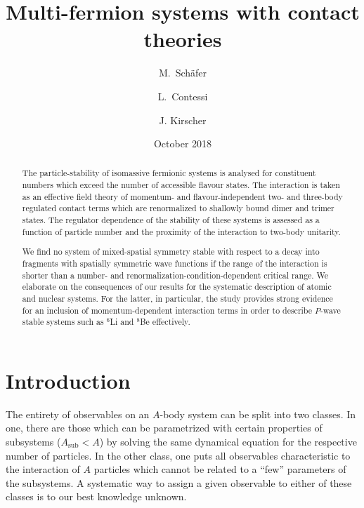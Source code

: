 \documentclass[preprint,12pt]{elsarticle}
\begin{document}
\title{Multi-fermion systems with contact theories}
\author{M.~Sch{\"a}fer}\address{Czech Technical University in Prague, Faculty of Nuclear Sciences 
and Physical Engineering, B\v{r}ehov\'{a} 7, 11519 Prague 1, Czech Republic} 
\author{L.~Contessi} 
\address{Racah Institute of Physics, The Hebrew university, 91904 Jerusalem, 
Israel} 
\address{ESNT, IRFU, CEA, Universite Paris Saclay, F-91191 Gif-sur-Yvette, France} 
\author{J. Kirscher}
\address{Theoretical Physics Division, School of Physics and Astronomy,
The University of Manchester, Manchester, M13 9PL, United Kingdom} 
\date{October 2018}


\begin{abstract}
The particle-stability of isomassive fermionic systems is analysed
for constituent numbers which exceed the number of accessible flavour states. The interaction is taken as an 
effective field theory of momentum- and flavour-independent two- and three-body
regulated contact terms which are renormalized to shallowly bound dimer and trimer states.
The regulator dependence of the stability of these systems is assessed as a function of
particle number and the proximity of the interaction to two-body unitarity.

We find no system of mixed-spatial symmetry stable with respect to
a decay into fragments with spatially symmetric wave functions if the range of the
interaction is shorter than a number- and renormalization-condition-dependent
critical range.
We elaborate on the consequences of our results for the systematic description of
atomic and nuclear systems. For the latter, in particular, the study provides
strong evidence for an inclusion of momentum-dependent interaction terms in order
to describe $P$-wave stable systems such as $^6$Li and $^8$Be effectively.
\end{abstract}

\maketitle

\newpage
\section{Introduction}
The entirety of observables on an $A$-body system can be split into two classes. In one, there are those
which can be parametrized with certain properties of subsystems ($A_\text{sub}<A$) by solving the same
dynamical equation for the respective number of particles. In the other class, one puts all observables
characteristic to the interaction of $A$ particles which cannot be related to a ``few'' parameters of the
subsystems. A systematic way to assign a given observable to either of these classes is to our best knowledge unknown.
\end{document}
